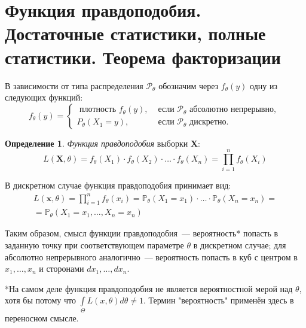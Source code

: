\documentclass[oneside,final,14pt]{extreport}
\theoremstyle{plain}
\theoremstyle{definition}
\newtheorem*{defn}{Определение}
\theoremstyle{named}
\begin{document}
\section{Функция правдоподобия. Достаточные статистики, полные статистики. Теорема факторизации}

В зависимости от типа распределения $\mathcal{P}_\theta$ обозначим через $f_{\theta}(y)$ одну из следующих функций:
\begin{equation*}
    f_{\theta}(y) =
    \left\{\begin{array}{ll}
    \text { плотность } f_{\theta}(y), & \text { если } \mathcal{P}_{\theta} \text { абсолютно непрерывно, } \\
    P_{\theta}\left(X_{1}=y\right), & \text { если } \mathcal{P}_{\theta} \text { дискретно. }
    \end{array}\right.
\end{equation*}

\begin{defn}
{\it Функция правдоподобия} выборки $\mathbf{X}$:
\begin{equation*}
    L(\mathbf{X} , \theta)=f_{\theta}\left(X_{1}\right) \cdot f_{\theta}\left(X_{2}\right) \cdot \ldots \cdot f_{\theta}\left(X_{n}\right)=\prod_{i=1}^{n} f_{\theta}\left(X_{i}\right)
\end{equation*}
\end{defn}

В дискретном случае функция правдоподобия принимает вид:
\begin{equation*}
\begin{aligned}
    L(\mathbf{x} , \theta)=\prod_{i=1}^{n} f_{\theta}(x_{i}) 
    = \mathbb{P}_{\theta}(X_{1}=x_{1}) \cdot \ldots \cdot \mathbb{P}_{\theta}(X_{n}=x_{n}) = \\
    = \mathbb{P}_{\theta}(X_{1}=x_{1}, \ldots, X_{n}=x_{n})
\end{aligned}
\end{equation*}

Таким образом, смысл функции правдоподобия~--- вероятность* попасть в заданную точку при соответствующем параметре $\theta$ в дискретном случае; для абсолютно непрерывного аналогично~--- вероятность попасть в куб с центром в $x_1, \ldots, x_n$ и сторонами $dx_1, \ldots, dx_n$.

*На самом деле функция правдоподобия не является вероятностной мерой над $\theta$, хотя бы потому что $\int\limits_{\Theta} L(x, \theta) d\theta \neq 1$. Термин "вероятность" применён здесь в переносном смысле.
\end{document}
